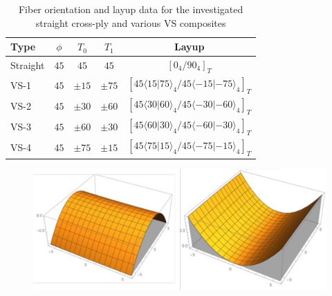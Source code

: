 \documentclass[journal]{new-aiaa}
\begin{document}
\begin{table}[!h]
	\centering
	\setlength{\arrayrulewidth}{2pt}
	\begin{tabular}{lcccc}
		\hline
		{Type} & {$\phi$} & {$T_0$}  & {$T_1$} & {Layup}\\
		\hline
		{Straight} & {$45$}& {$45$} & {$45$} &{$\left[0_4/90_4\right]_{T}$}\\
		{VS-1}  & {$45$}& {$\pm 15$} & {$\pm 75$} & {$[45\langle{15|75 \rangle}_4/45\langle {-15|-75 \rangle}_4]_{T}$}\\
		{VS-2}  & {$45$}& {$\pm 30$} & {$\pm 60$} & {$[45\langle{30|60 \rangle}_4/45\langle {-30|-60 \rangle}_4]_{T}$}\\
		{VS-3} & {$45$} & {$\pm 60$} & {$\pm 30$} & {$[45\langle{60|30 \rangle}_4/45\langle {-60|-30 \rangle}_4]_{T}$}\\ 
		{VS-4} & {$45$} & {$\pm 75$} & {$\pm 15$} & {$[45\langle{75|15 \rangle}_4/45\langle {-75|-15 \rangle}_4]_{T}$}\\
		\hline
	\end{tabular}
	\vspace{5 mm}
	\caption{Fiber orientation and layup data for the investigated straight cross-ply and various VS composites}
	\label{data122}
\end{table}
\begin{figure}[!htb]
	\captionsetup[subfloat]{farskip=0.5pt,captionskip=2pt}
	\centering	
	\includegraphics[width=.70\textwidth]{figures2/drawing.pdf}
	\label{fig:shapes}
\end{figure}


\end{document}
